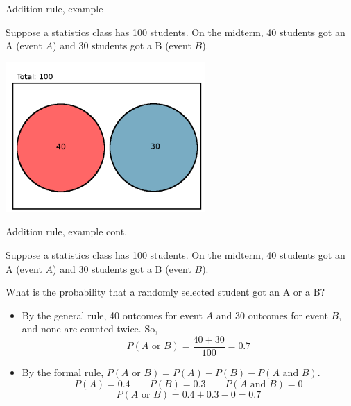 \documentclass[xcolor=table]{beamer}
\begin{document}
\begin{frame}{Addition rule, example}
\begin{block}{}
Suppose a statistics class has 100 students. On the midterm, 40 students got an A (event $A$) and 30 students got a B (event $B$).
\end{block}

{\centering
\includegraphics[width=3in]{../images/ch4_venn_dsj_ex}\par
}
\end{frame}

\begin{frame}{Addition rule, example cont.}
\begin{block}{}
Suppose a statistics class has 100 students. On the midterm, 40 students got an A (event $A$) and 30 students got a B (event $B$).
\end{block}

\begin{exampleblock}{}
What is the probability that a randomly selected student got an A or a B?
\begin{itemize}
\pause
\item By the general rule, 40 outcomes for event $A$ and 30 outcomes for event $B$, and none are counted twice. So,
\[P(A \text{ or } B) = \frac {40 + 30}{100} = 0.7\]
\pause
\item By the formal rule, $P(A \text{ or } B) = P(A) + P(B) - P(A \text{ and } B)$.
\[P(A) = 0.4 \qquad P(B) = 0.3 \qquad P(A \text{ and } B) = 0\]
\[P(A \text{ or } B) = 0.4 + 0.3 - 0 = 0.7\]

\end{itemize}
\end{exampleblock}
\end{frame}
\end{document}
